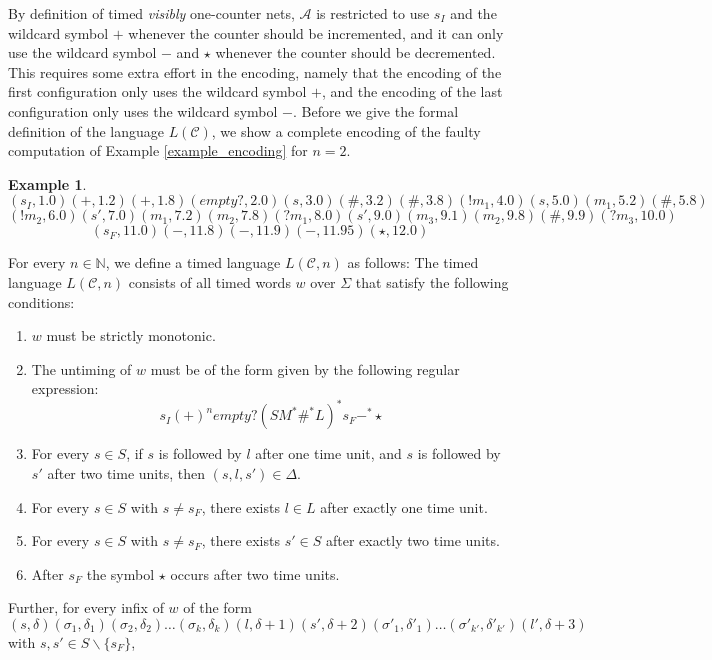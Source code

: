 \documentclass{CSML}
\theoremstyle{plain}\newtheorem{theorem}[thm]{Theorem}
\theoremstyle{plain}\newtheorem{corollary}[thm]{Corollary}
\theoremstyle{plain}\newtheorem{example}[thm]{Example}
\theoremstyle{plain}\newtheorem{lemma}[thm]{Lemma}
\theoremstyle{plain}\newtheorem{remark}[thm]{Remark}
\newcommand{\N}{\mathbb{N}}
\newcommand{\A}{\mathcal{A}}
\newcommand{\cm}{\mathcal{C}}
\begin{document}
By definition of timed \emph{visibly} one-counter nets, $\A$ is restricted to use $s_I$ and the wildcard symbol $+$ whenever the counter should be incremented, and it can only use the wildcard symbol $-$ and $\star$ whenever the counter should be decremented.  
This requires some extra effort in the encoding, namely that the encoding of the first configuration only uses the wildcard symbol $+$, and the encoding of the last configuration only uses the wildcard symbol $-$. 
Before we give the formal definition of the language $L(\cm)$, 
we show a complete encoding of the faulty computation of Example \ref{example_encoding} for $n=2$.
\begin{example}
	\label{example_thewholeenc}
	$$(s_I,1.0)(+,1.2)(+,1.8)(empty?,2.0)(s,3.0)(\#,3.2)(\#,3.8)(!m_1,4.0)(s,5.0)(m_1,5.2)(\#,5.8)$$
	$$(!m_2,6.0)(s',7.0)(m_1,7.2)(m_2,7.8)(?m_1,8.0)(s',9.0)(m_3,9.1)(m_2,9.8)(\#,9.9)(?m_3,10.0)$$
	$$(s_F,11.0)(-,11.8)(-,11.9)(-,11.95)(\star,12.0)$$
\end{example}
For every $n\in\N$, we define a timed language $L(\cm, n)$  as follows: 
The timed language $L(\cm,n)$ consists of all timed words $w$ over $\Sigma$ that satisfy the following conditions:
\begin{enumerate}
\item $w$ must be strictly monotonic. 
	
\item The untiming of $w$ must be of the form given by the following regular expression: 
	$$s_I (+)^n empty? (S M^* \#^* L)^* s_F -^* \star$$
\item For every $s\in S$, if $s$ is followed by $l$ after one time unit, and $s$ is followed by $s'$ after two time units, then $(s,l,s')\in\Delta$. 
	
	
\item For every $s\in S$ with $s\neq s_F$, there exists $l\in L$ after exactly one time unit. 
	
\item For every $s\in S$ with $s\neq s_F$, there exists $s'\in S$ after exactly two time units.
	
\item After  $s_F$ the symbol $\star$ occurs after two time units.
	
	
\end{enumerate}
Further,
for every infix of $w$ of the form
$$(s,\delta)(\sigma_1,\delta_1)(\sigma_2,\delta_2)\dots(\sigma_k,\delta_k)(l,\delta+1)(s',\delta+2)(\sigma'_1,\delta'_1)\dots(\sigma'_{k'},\delta'_{k'})(l',\delta+3)$$
with $s,s'\in S\backslash\{s_F\}$,
\end{document}
